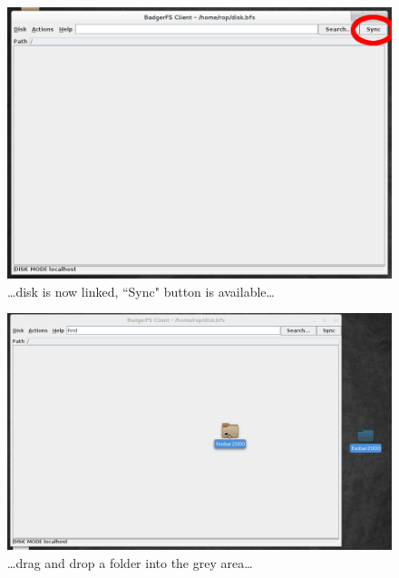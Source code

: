 \begin{figure}[h!]
\centering
\includegraphics[width=1\textwidth]{figures/serverUseCase/05_linked.png}
\caption{\ldots disk is now linked, ``Sync" button is available\ldots}
\label{fig:05_linked.png}
\end{figure}

\begin{figure}[h!]
\centering
\includegraphics[width=1\textwidth]{figures/serverUseCase/06_dragndrop.png}
\caption{\ldots drag and drop a folder into the grey area\ldots}
\label{fig:06_dragndrop.png}
\end{figure}

